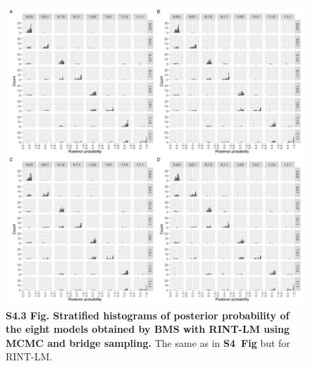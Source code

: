 \documentclass[11pt]{article}
\newcommand{\sfighistmcmcnl}{\textbf{S4~Fig}\xspace}
\begin{document}
\begin{figure}[!ht]
\begin{center}
  \includegraphics[width=1\textwidth]{png/sim_hist_mcmc_bs_rint.png}
\end{center}  
\caption{
  {\bf
    S4.3 Fig.
    Stratified histograms of posterior probability of the eight models obtained by BMS with RINT-LM using MCMC and bridge sampling.}
The same as in \sfighistmcmcnl but for RINT-LM.
}
\label{s-fig:sim-hist-mcmc-rint}
\end{figure}
\end{document}
